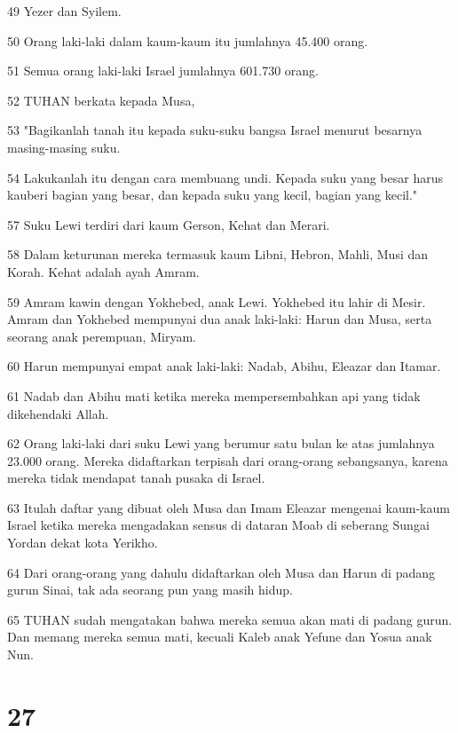\par 49 Yezer dan Syilem.
\par 50 Orang laki-laki dalam kaum-kaum itu jumlahnya 45.400 orang.
\par 51 Semua orang laki-laki Israel jumlahnya 601.730 orang.
\par 52 TUHAN berkata kepada Musa,
\par 53 "Bagikanlah tanah itu kepada suku-suku bangsa Israel menurut besarnya masing-masing suku.
\par 54 Lakukanlah itu dengan cara membuang undi. Kepada suku yang besar harus kauberi bagian yang besar, dan kepada suku yang kecil, bagian yang kecil."
\par 57 Suku Lewi terdiri dari kaum Gerson, Kehat dan Merari.
\par 58 Dalam keturunan mereka termasuk kaum Libni, Hebron, Mahli, Musi dan Korah. Kehat adalah ayah Amram.
\par 59 Amram kawin dengan Yokhebed, anak Lewi. Yokhebed itu lahir di Mesir. Amram dan Yokhebed mempunyai dua anak laki-laki: Harun dan Musa, serta seorang anak perempuan, Miryam.
\par 60 Harun mempunyai empat anak laki-laki: Nadab, Abihu, Eleazar dan Itamar.
\par 61 Nadab dan Abihu mati ketika mereka mempersembahkan api yang tidak dikehendaki Allah.
\par 62 Orang laki-laki dari suku Lewi yang berumur satu bulan ke atas jumlahnya 23.000 orang. Mereka didaftarkan terpisah dari orang-orang sebangsanya, karena mereka tidak mendapat tanah pusaka di Israel.
\par 63 Itulah daftar yang dibuat oleh Musa dan Imam Eleazar mengenai kaum-kaum Israel ketika mereka mengadakan sensus di dataran Moab di seberang Sungai Yordan dekat kota Yerikho.
\par 64 Dari orang-orang yang dahulu didaftarkan oleh Musa dan Harun di padang gurun Sinai, tak ada seorang pun yang masih hidup.
\par 65 TUHAN sudah mengatakan bahwa mereka semua akan mati di padang gurun. Dan memang mereka semua mati, kecuali Kaleb anak Yefune dan Yosua anak Nun.

\chapter{27}


